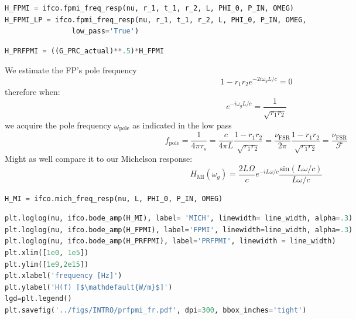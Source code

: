 \begin{spacing}{1.2}\begin{lstlisting}[frame=single, language=Python]
H_FPMI = ifco.fpmi_freq_resp(nu, r_1, t_1, r_2, L, PHI_0, P_IN, OMEG)
H_FPMI_LP = ifco.fpmi_freq_resp(nu, r_1, t_1, r_2, L, PHI_0, P_IN, OMEG, 
				low_pass='True')
\end{lstlisting}\end{spacing}

\begin{spacing}{1.2}\begin{lstlisting}[frame=single, language=Python]
H_PRFPMI = ((G_PRC_actual)**.5)*H_FPMI
\end{lstlisting}\end{spacing}

We estimate the FP's pole frequency
\begin{equation}  1 - r_1 r_2 e^{-2i \omega_g L / c} = 0 \end{equation} therefore when:
\begin{equation} e^{-i \omega_g L / c} = \frac{1}{\sqrt{r_1 r_2}} \end{equation} we acquire the
pole frequency \(\omega_\mathrm{pole}\) as indicated in the low pass
\begin{equation} f_\mathrm{pole} = \frac{1}{4\pi \tau_{s}} =  \frac{c}{4 \pi L} \frac{1- r_1 r_2}{\sqrt{r_1 r_2}} = \frac{\nu_\mathrm{FSR}}{2 \pi} \frac{1- r_1 r_2}{\sqrt{r_1 r_2}} = \frac{\nu_\mathrm{FSR}}{\mathcal{F}} \end{equation}Might
as well compare it to our Michelson response:
\begin{equation} H_{\mathrm{MI}}(\omega_g) = \frac{2 L \Omega}{c}e^{-i L \omega / c} \frac{\mathrm{sin}(L \omega /c)}{L \omega /c} \end{equation}

\begin{spacing}{1.2}\begin{lstlisting}[frame=single, language=Python]
H_MI = ifco.mich_freq_resp(nu, L, PHI_0, P_IN, OMEG)
\end{lstlisting}\end{spacing}

\begin{spacing}{1.2}\begin{lstlisting}[frame=single, language=Python]
plt.loglog(nu, ifco.bode_amp(H_MI), label= 'MICH', linewidth= line_width, alpha=.3)
plt.loglog(nu, ifco.bode_amp(H_FPMI), label='FPMI', linewidth=line_width, alpha=.3)
plt.loglog(nu, ifco.bode_amp(H_PRFPMI), label='PRFPMI', linewidth = line_width)
plt.xlim([1e0, 1e5])
plt.ylim([1e9,2e15])
plt.xlabel('frequency [Hz]')
plt.ylabel('H(f) [$\mathdefault{W/m}$]')
lgd=plt.legend()
plt.savefig('../figs/INTRO/prfpmi_fr.pdf', dpi=300, bbox_inches='tight')
\end{lstlisting}\end{spacing}

